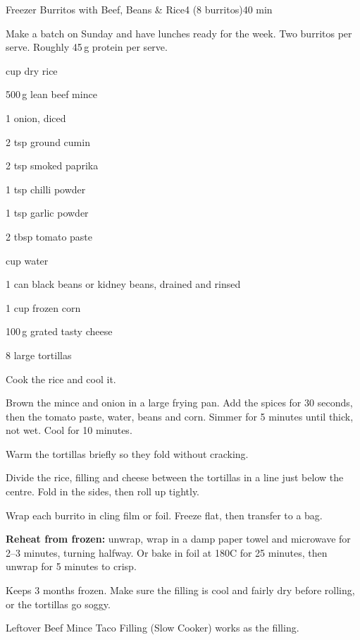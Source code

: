 \begin{recipebox}{Freezer Burritos with Beef, Beans \& Rice}{4 (8 burritos)}{40 min}

Make a batch on Sunday and have lunches ready for the week. Two burritos per
serve. Roughly 45\,g protein per serve.

\begin{ingredients}
  \item {} cup dry rice
  \item 500\,g lean beef mince
  \item 1 onion, diced
  \item 2 tsp ground cumin
  \item 2 tsp smoked paprika
  \item 1 tsp chilli powder
  \item 1 tsp garlic powder
  \item 2 tbsp tomato paste
  \item {} cup water
  \item 1 can black beans or kidney beans, drained and rinsed
  \item 1 cup frozen corn
  \item 100\,g grated tasty cheese
  \item 8 large tortillas
\end{ingredients}

\begin{method}
  \item Cook the rice and cool it.
  \item Brown the mince and onion in a large frying pan. Add the spices for 30 seconds, then the tomato paste, water, beans and corn. Simmer for 5 minutes until thick, not wet. Cool for 10 minutes.
  \item Warm the tortillas briefly so they fold without cracking.
  \item Divide the rice, filling and cheese between the tortillas in a line just below the centre. Fold in the sides, then roll up tightly.
  \item Wrap each burrito in cling film or foil. Freeze flat, then transfer to a bag.
\end{method}

\begin{notelist}
  \item \textbf{Reheat from frozen:} unwrap, wrap in a damp paper towel and microwave for 2--3 minutes, turning halfway. Or bake in foil at 180\degree C for 25 minutes, then unwrap for 5 minutes to crisp.
  \item Keeps 3 months frozen. Make sure the filling is cool and fairly dry before rolling, or the tortillas go soggy.
  \item Leftover Beef Mince Taco Filling (Slow Cooker) works as the filling.
\end{notelist}

\end{recipebox}
